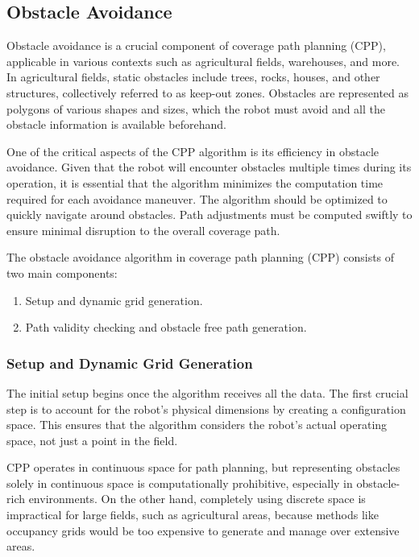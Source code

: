 
\subsection{Obstacle Avoidance}


Obstacle avoidance is a crucial component of coverage path planning (CPP), applicable in various contexts such as agricultural fields, warehouses, and more. In agricultural fields, static obstacles include trees, rocks, houses, and other structures, collectively referred to as keep-out zones. Obstacles are represented as polygons of various shapes and sizes, which the robot must avoid and all the obstacle information is available beforehand. 

\vspace*{6mm}  

One of the critical aspects of the CPP algorithm is its efficiency in obstacle avoidance. Given that the robot will encounter obstacles multiple times during its operation, it is essential that the algorithm minimizes the computation time required for each avoidance maneuver. The algorithm should be optimized to quickly navigate around obstacles. Path adjustments must be computed swiftly to ensure minimal disruption to the overall coverage path. 


\vspace*{6mm}  


The obstacle avoidance algorithm in coverage path planning (CPP) consists of two main components:

\begin{enumerate}
    \setlength\itemsep{0em}
    \item Setup and dynamic grid generation.
    \item Path validity checking and obstacle free path generation.
\end{enumerate}

\subsubsection{Setup and Dynamic Grid Generation}

The initial setup begins once the algorithm receives all the data. The first crucial step is to account for the robot's physical dimensions by creating a configuration space. This ensures that the algorithm considers the robot's actual operating space, not just a point in the field.

\vspace*{6mm}  

CPP operates in continuous space for path planning, but representing obstacles solely in continuous space is computationally prohibitive, especially in obstacle-rich environments. On the other hand, completely using discrete space is impractical for large fields, such as agricultural areas, because methods like occupancy grids would be too expensive to generate and manage over extensive areas.

